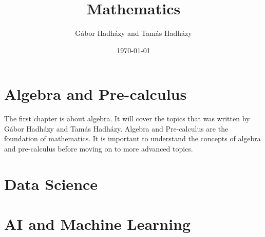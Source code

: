 \documentclass[a4paper,12pt]{book}
\author{Gábor Hadházy and Tamás Hadházy}
\title{Mathematics}
\date{\today}
\begin{document}
\maketitle

\tableofcontents

\chapter{Algebra and Pre-calculus}
The first chapter is about algebra. It will cover the topics that was written by Gábor Hadházy and Tamás Hadházy. Algebra and Pre-calculus are the foundation of mathematics. It is important to understand the concepts of algebra and pre-calculus before moving on to more advanced topics.


\chapter{Data Science}

\chapter{AI and Machine Learning}
\end{document}
